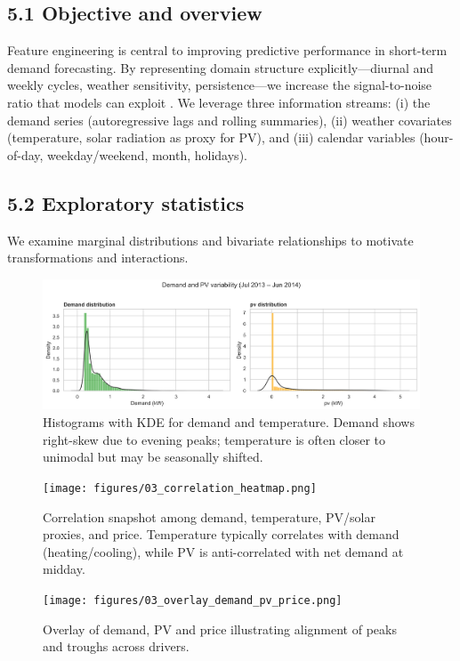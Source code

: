\documentclass[12pt,a4paper]{article}
\begin{document}
\subsection*{5.1 Objective and overview}
Feature engineering is central to improving predictive performance in short-term demand forecasting. By representing domain structure explicitly---diurnal and weekly cycles, weather sensitivity, persistence---we increase the signal-to-noise ratio that models can exploit \cite{Zheng2020,Hyndman2021}. We leverage three information streams: (i) the demand series (autoregressive lags and rolling summaries), (ii) weather covariates (temperature, solar radiation as proxy for PV), and (iii) calendar variables (hour-of-day, weekday/weekend, month, holidays).

\subsection*{5.2 Exploratory statistics}
We examine marginal distributions and bivariate relationships to motivate transformations and interactions.

\begin{figure}[H]
  \centering
  \includegraphics[width=0.95\linewidth]{figures/task3_fig2_distributions.png}
  \caption{Histograms with KDE for demand and temperature. Demand shows right-skew due to evening peaks; temperature is often closer to unimodal but may be seasonally shifted.}
  \label{fig:fe_hist_kde}
\end{figure}

\begin{figure}[H]
  \centering
  \texttt{[image: figures/03\_correlation\_heatmap.png]}
  \caption{Correlation snapshot among demand, temperature, PV/solar proxies, and price. Temperature typically correlates with demand (heating/cooling), while PV is anti-correlated with net demand at midday.}
  \label{fig:fe_corr}
\end{figure}

\begin{figure}[H]
  \centering
  \texttt{[image: figures/03\_overlay\_demand\_pv\_price.png]}
  \caption{Overlay of demand, PV and price illustrating alignment of peaks and troughs across drivers.}
  \label{fig:fe_overlay}
\end{figure}
\end{document}
